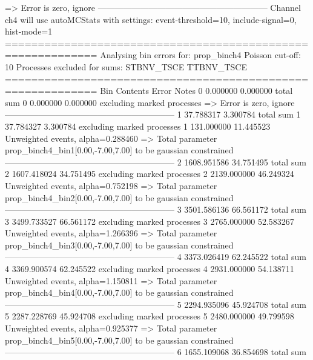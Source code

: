   => Error is zero, ignore      
------------------------------------------------------------
Channel ch4 will use autoMCStats with settings: event-threshold=10, include-signal=0, hist-mode=1
============================================================
Analysing bin errors for: prop_binch4
Poisson cut-off: 10
Processes excluded for sums: STBNV_TSCE TTBNV_TSCE
============================================================
Bin        Contents        Error           Notes                         
0          0.000000        0.000000        total sum                     
0          0.000000        0.000000        excluding marked processes    
  => Error is zero, ignore      
------------------------------------------------------------
1          37.788317       3.300784        total sum                     
1          37.784327       3.300784        excluding marked processes    
1          131.000000      11.445523       Unweighted events, alpha=0.288460
  => Total parameter prop_binch4_bin1[0.00,-7.00,7.00] to be gaussian constrained
------------------------------------------------------------
2          1608.951586     34.751495       total sum                     
2          1607.418024     34.751495       excluding marked processes    
2          2139.000000     46.249324       Unweighted events, alpha=0.752198
  => Total parameter prop_binch4_bin2[0.00,-7.00,7.00] to be gaussian constrained
------------------------------------------------------------
3          3501.586136     66.561172       total sum                     
3          3499.733527     66.561172       excluding marked processes    
3          2765.000000     52.583267       Unweighted events, alpha=1.266396
  => Total parameter prop_binch4_bin3[0.00,-7.00,7.00] to be gaussian constrained
------------------------------------------------------------
4          3373.026419     62.245522       total sum                     
4          3369.900574     62.245522       excluding marked processes    
4          2931.000000     54.138711       Unweighted events, alpha=1.150811
  => Total parameter prop_binch4_bin4[0.00,-7.00,7.00] to be gaussian constrained
------------------------------------------------------------
5          2294.935096     45.924708       total sum                     
5          2287.228769     45.924708       excluding marked processes    
5          2480.000000     49.799598       Unweighted events, alpha=0.925377
  => Total parameter prop_binch4_bin5[0.00,-7.00,7.00] to be gaussian constrained
------------------------------------------------------------
6          1655.109068     36.854698       total sum                     
